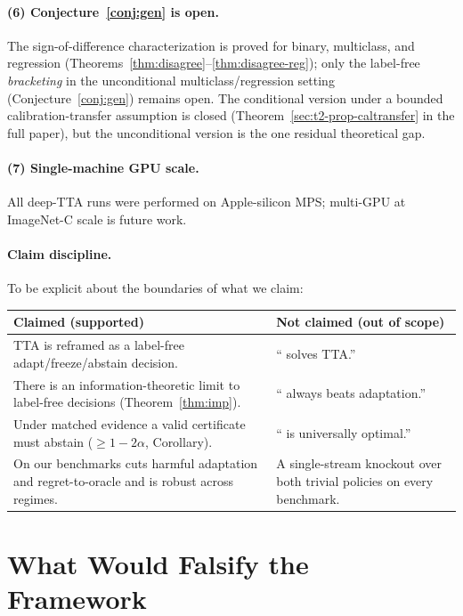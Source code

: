 \paragraph{(6) Conjecture~\ref{conj:gen} is open.}
The sign-of-difference characterization is proved for binary, multiclass, and
regression (Theorems~\ref{thm:disagree}--\ref{thm:disagree-reg}); only the label-free
\emph{bracketing} in the unconditional multiclass/regression setting (Conjecture~\ref{conj:gen})
remains open.  The conditional version under a bounded calibration-transfer
assumption is closed (Theorem~\ref{sec:t2-prop-caltransfer} in the full paper), but the
unconditional version is the one residual theoretical gap.

\paragraph{(7) Single-machine GPU scale.}
All deep-TTA runs were performed on Apple-silicon MPS; multi-GPU at ImageNet-C
scale is future work.

\paragraph{Claim discipline.}
To be explicit about the boundaries of what we claim:

\begin{center}\small
\begin{tabular}{p{}p{}}
\toprule
\textbf{Claimed (supported)} & \textbf{Not claimed (out of scope)} \\
\midrule
TTA is reframed as a label-free adapt/freeze/abstain decision. & ``\KBound{} solves TTA.'' \\
There is an information-theoretic limit to label-free decisions (Theorem~\ref{thm:imp}). & ``\KBound{} always beats adaptation.'' \\
Under matched evidence a valid certificate must abstain ($\geq 1-2\alpha$, Corollary). & ``\KBound{} is universally optimal.'' \\
On our benchmarks \KGA{} cuts harmful adaptation and regret-to-oracle and is robust across regimes. & A single-stream knockout over both trivial policies on every benchmark. \\
\bottomrule
\end{tabular}
\end{center}

\section{What Would Falsify the Framework}\label{sec:disc-falsify}


